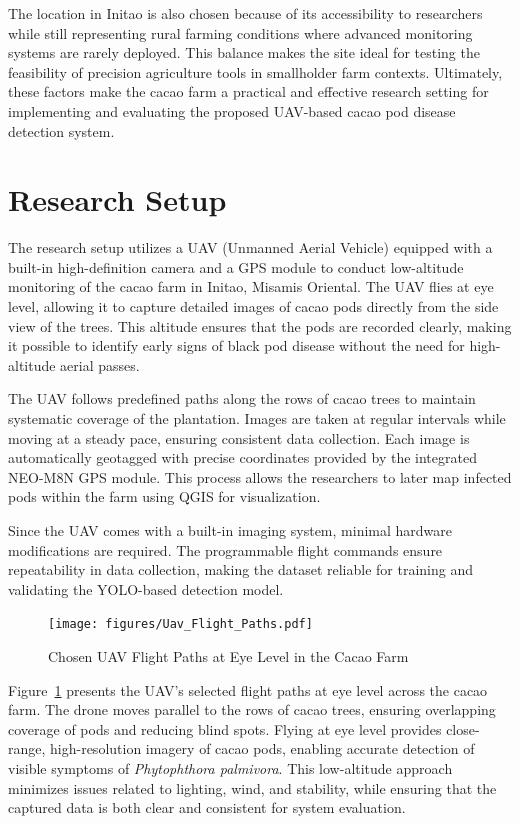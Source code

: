 The location in Initao is also chosen because of its accessibility to researchers while still representing rural farming conditions where advanced monitoring systems are rarely deployed.
This balance makes the site ideal for testing the feasibility of precision agriculture tools in smallholder farm contexts.
Ultimately, these factors make the cacao farm a practical and effective research setting for implementing and evaluating the proposed UAV-based cacao pod disease detection system.


\section{Research Setup}

The research setup utilizes a UAV (Unmanned Aerial Vehicle) equipped with a built-in high-definition camera and a GPS module to conduct low-altitude monitoring of the cacao farm in Initao, Misamis Oriental.
The UAV flies at eye level, allowing it to capture detailed images of cacao pods directly from the side view of the trees.
This altitude ensures that the pods are recorded clearly, making it possible to identify early signs of black pod disease without the need for high-altitude aerial passes.

The UAV follows predefined paths along the rows of cacao trees to maintain systematic coverage of the plantation.
Images are taken at regular intervals while moving at a steady pace, ensuring consistent data collection.
Each image is automatically geotagged with precise coordinates provided by the integrated NEO-M8N GPS module.
This process allows the researchers to later map infected pods within the farm using QGIS for visualization.

Since the UAV comes with a built-in imaging system, minimal hardware modifications are required.
The programmable flight commands ensure repeatability in data collection, making the dataset reliable for training and validating the YOLO-based detection model.

\begin{figure}[H]
	\centering
	\caption{Chosen UAV Flight Paths at Eye Level in the Cacao Farm}
	\label{fig:uav_flight_paths}
	\texttt{[image: figures/Uav\_Flight\_Paths.pdf]}
\end{figure}

Figure~\ref{fig:uav_flight_paths} presents the UAV’s selected flight paths at eye level across the cacao farm.
The drone moves parallel to the rows of cacao trees, ensuring overlapping coverage of pods and reducing blind spots.
Flying at eye level provides close-range, high-resolution imagery of cacao pods, enabling accurate detection of visible symptoms of \textit{Phytophthora palmivora}.
This low-altitude approach minimizes issues related to lighting, wind, and stability, while ensuring that the captured data is both clear and consistent for system evaluation.


